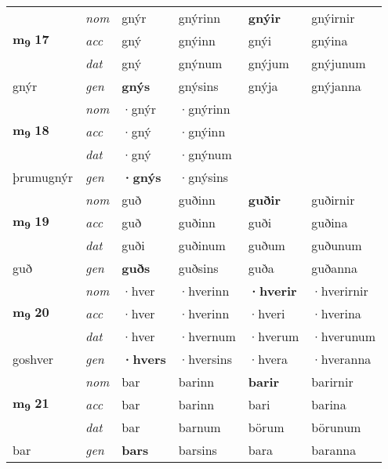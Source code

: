 \begin{longtable}[l]{X>{\footnotesize\itshape}XXXXX}
\multirow{3}{*}{{{\textbf{m{\textsubscript{9}}} \Large{\textbf{17}}}}}  
 & nom & gnýr & gnýrinn    & \textbf{gnýir} & gnýirnir  \\*
 & acc & gný  & gnýinn   & gnýi  & gnýina \\*
 & dat & gný & gnýnum   & gnýjum & gnýjunum \\*
 {\footnotesize{gnýr}} &  gen & \textbf{gnýs}  & gnýsins  & gnýja & gnýjanna \\
\cmidrule{1-6}


\multirow{3}{*}{{{\textbf{m{\textsubscript{9}}} \Large{\textbf{18}}}}}  
 & nom & ·gnýr & ·gnýrinn    & \textbf{} &   \\*
 & acc & ·gný  & ·gnýinn   &   &  \\*
 & dat & ·gný & ·gnýnum   &  &  \\*
 {\footnotesize{þrumugnýr}} &  gen & \textbf{·gnýs}  & ·gnýsins  &  &  \\
\cmidrule{1-6}


\multirow{3}{*}{{{\textbf{m{\textsubscript{9}}} \Large{\textbf{19}}}}}  
 & nom & guð & guðinn    & \textbf{guðir} & guðirnir  \\*
 & acc & guð  & guðinn   & guði  & guðina \\*
 & dat & guði & guðinum   & guðum & guðunum \\*
 {\footnotesize{guð}} &  gen & \textbf{guðs}  & guðsins  & guða & guðanna \\
\cmidrule{1-6}


\multirow{3}{*}{{{\textbf{m{\textsubscript{9}}} \Large{\textbf{20}}}}}  
 & nom & ·hver & ·hverinn    & \textbf{·hverir} & ·hverirnir  \\*
 & acc & ·hver  & ·hverinn   & ·hveri  & ·hverina \\*
 & dat & ·hver & ·hvernum   & ·hverum & ·hverunum \\*
 {\footnotesize{goshver}} &  gen & \textbf{·hvers}  & ·hversins  & ·hvera & ·hveranna \\
\cmidrule{1-6}


\multirow{3}{*}{{{\textbf{m{\textsubscript{9}}} \Large{\textbf{21}}}}}  
 & nom & bar & barinn    & \textbf{barir} & barirnir  \\*
 & acc & bar  & barinn   & bari  & barina \\*
 & dat & bar & barnum   & börum & börunum \\*
 {\footnotesize{bar}} &  gen & \textbf{bars}  & barsins  & bara & baranna \\
\cmidrule{1-6}



\end{longtable}

